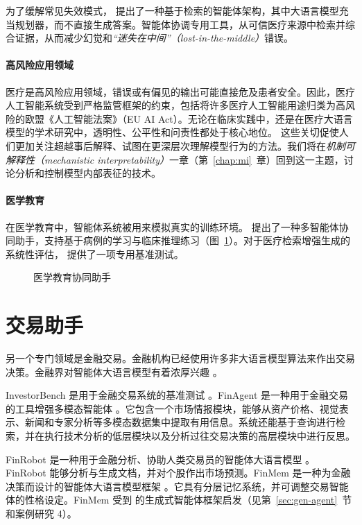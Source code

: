 为了缓解常见失效模式，\citet{das2024improved} 提出了一种基于检索的智能体架构，其中大语言模型充当规划器，而不直接生成答案。智能体协调专用工具，从可信医疗来源中检索并综合证据，从而减少幻觉和{\em “迷失在中间”（lost-in-the-middle）}错误。

\paragraph{高风险应用领域}
医疗是高风险应用领域，错误或有偏见的输出可能直接危及患者安全。因此，医疗人工智能系统受到严格监管框架的约束，包括将许多医疗人工智能用途归类为高风险的欧盟《人工智能法案》（EU AI Act）。无论在临床实践中，还是在医疗大语言模型的学术研究中，透明性、公平性和问责性都处于核心地位。
这些关切促使人们更加关注超越事后解释、试图在更深层次理解模型行为的方法。我们将在{\em 机制可解释性（mechanistic interpretability）}一章（第~\ref{chap:mi}~章）回到这一主题，讨论分析和控制模型内部表征的技术。

\paragraph{医学教育}
在医学教育中，智能体系统被用来模拟真实的训练环境。\citet{wei2024medco} 提出了一种多智能体协同助手，支持基于病例的学习与临床推理练习（图~\ref{fig:medco}）。对于医疗检索增强生成的系统性评估，\citet{qiao2024benchmarking} 提供了一项专用基准测试。

\begin{figure}
  \begin{center}
    
    \caption{医学教育协同助手 \citep{wei2024medco}}\label{fig:medco}
  \end{center}
\end{figure}

\section{交易助手}
另一个专门领域是金融交易。金融机构已经使用许多非大语言模型算法来作出交易决策。金融界对智能体大语言模型有着浓厚兴趣 \citep{ding2024large}。

InvestorBench 是用于金融交易系统的基准测试 \citep{li2024investorbench}。FinAgent 是一种用于金融交易的工具增强多模态智能体 \citep{zhang2024finagent}。它包含一个市场情报模块，能够从资产价格、视觉表示、新闻和专家分析等多模态数据集中提取有用信息。系统还能基于查询进行检索，并在执行技术分析的低层模块以及分析过往交易决策的高层模块中进行反思。

FinRobot 是一种用于金融分析、协助人类交易员的智能体大语言模型 \citep{yang2024finrobot}。FinRobot 能够分析与生成文档，并对个股作出市场预测。FinMem 是一种为金融决策而设计的智能体大语言模型框架 \citep{yu2024finmem}。它具有分层记忆系统，并可调整交易智能体的性格设定。FinMem 受到 \citet{park2023generative} 的生成式智能体框架启发（见第~\ref{sec:gen-agent}~节和案例研究 4）。

